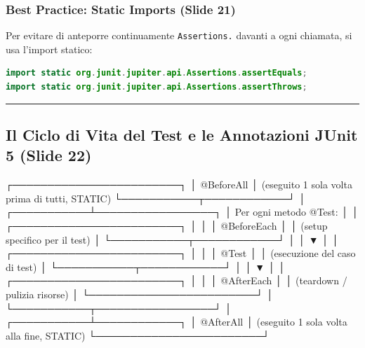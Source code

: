 \documentclass[11pt,a4paper,oneside]{report}
\newcommand{\passthrough}[1]{#1}
\begin{document}
\subsubsection{Best Practice: Static Imports (Slide
21)}\label{chap18_best-practice-static-imports-slide-21}

Per evitare di anteporre continuamente
\passthrough{\lstinline!Assertions.!} davanti a ogni chiamata, si usa
l'import statico:

\begin{lstlisting}[language=Java]
import static org.junit.jupiter.api.Assertions.assertEquals;
import static org.junit.jupiter.api.Assertions.assertThrows;
\end{lstlisting}

\begin{center}\rule{0.5\linewidth}{0.5pt}\end{center}

\subsection{Il Ciclo di Vita del Test e le Annotazioni JUnit 5 (Slide
22)}\label{chap18_il-ciclo-di-vita-del-test-e-le-annotazioni-junit-5-slide-22}

\needspace{7cm}
\begin{asciibox}
┌────────────────────────┐
│      @BeforeAll        │ (eseguito 1 sola volta prima di tutti, STATIC)
└───────────┬────────────┘
            │
┌───────────┴─────────────────┐
│   Per ogni metodo @Test:    │
│  ┌────────────────────────┐ │
│  │      @BeforeEach       │ │ (setup specifico per il test)
│  └───────────┬────────────┘ │
│              ▼              │
│  ┌────────────────────────┐ │
│  │         @Test          │ │ (esecuzione del caso di test)
│  └───────────┬────────────┘ │
│              ▼              │
│  ┌────────────────────────┐ │
│  │       @AfterEach       │ │ (teardown / pulizia risorse)
│  └────────────────────────┘ │
└───────────┬─────────────────┘
            │
┌───────────┴────────────┐
│       @AfterAll        │ (eseguito 1 sola volta alla fine, STATIC)
└────────────────────────┘
\end{asciibox}
\end{document}
